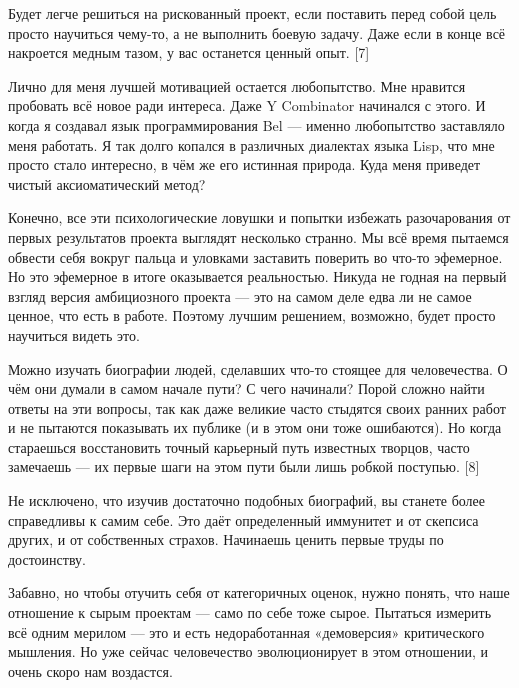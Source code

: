\documentclass[ebook,12pt,oneside,openany]{memoir}
\begin{document}
Будет легче решиться на рискованный проект, если поставить перед собой
цель просто научиться чему-то, а не выполнить боевую задачу. Даже если
в конце всё накроется медным тазом, у вас останется ценный опыт. [7]

Лично для меня лучшей мотивацией остается любопытство. Мне нравится
пробовать всё новое ради интереса. Даже Y Combinator начинался с
этого. И когда я создавал язык программирования Bel — именно
любопытство заставляло меня работать. Я так долго копался в различных
диалектах языка Lisp, что мне просто стало интересно, в чём же его
истинная природа. Куда меня приведет чистый аксиоматический метод?

Конечно, все эти психологические ловушки и попытки избежать
разочарования от первых результатов проекта выглядят несколько
странно. Мы всё время пытаемся обвести себя вокруг пальца и уловками
заставить поверить во что-то эфемерное. Но это эфемерное в итоге
оказывается реальностью. Никуда не годная на первый взгляд версия
амбициозного проекта — это на самом деле едва ли не самое ценное, что
есть в работе. Поэтому лучшим решением, возможно, будет просто
научиться видеть это.

Можно изучать биографии людей, сделавших что-то стоящее для
человечества. О чём они думали в самом начале пути? С чего начинали?
Порой сложно найти ответы на эти вопросы, так как даже великие часто
стыдятся своих ранних работ и не пытаются показывать их публике (и в
этом они тоже ошибаются). Но когда стараешься восстановить точный
карьерный путь известных творцов, часто замечаешь — их первые шаги на
этом пути были лишь робкой поступью. [8]

Не исключено, что изучив достаточно подобных биографий, вы станете
более справедливы к самим себе. Это даёт определенный иммунитет и от
скепсиса других, и от собственных страхов. Начинаешь ценить первые
труды по достоинству.

Забавно, но чтобы отучить себя от категоричных оценок, нужно понять,
что наше отношение к сырым проектам — само по себе тоже сырое.
Пытаться измерить всё одним мерилом — это и есть недоработанная
«демоверсия» критического мышления. Но уже сейчас человечество
эволюционирует в этом отношении, и очень скоро нам воздастся.
\end{document}
